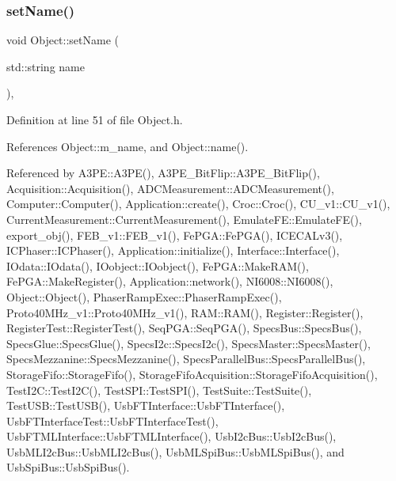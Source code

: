 \subsubsection{\texorpdfstring{set\+Name()}{setName()}}
{\footnotesize\ttfamily void Object\+::set\+Name (\begin{DoxyParamCaption}\item[{std\+::string}]{name }\end{DoxyParamCaption})\hspace{0.3cm}{\ttfamily [inline]}, {\ttfamily [inherited]}}



Definition at line 51 of file Object.\+h.



References Object\+::m\+\_\+name, and Object\+::name().



Referenced by A3\+P\+E\+::\+A3\+P\+E(), A3\+P\+E\+\_\+\+Bit\+Flip\+::\+A3\+P\+E\+\_\+\+Bit\+Flip(), Acquisition\+::\+Acquisition(), A\+D\+C\+Measurement\+::\+A\+D\+C\+Measurement(), Computer\+::\+Computer(), Application\+::create(), Croc\+::\+Croc(), C\+U\+\_\+v1\+::\+C\+U\+\_\+v1(), Current\+Measurement\+::\+Current\+Measurement(), Emulate\+F\+E\+::\+Emulate\+F\+E(), export\+\_\+obj(), F\+E\+B\+\_\+v1\+::\+F\+E\+B\+\_\+v1(), Fe\+P\+G\+A\+::\+Fe\+P\+G\+A(), I\+C\+E\+C\+A\+Lv3(), I\+C\+Phaser\+::\+I\+C\+Phaser(), Application\+::initialize(), Interface\+::\+Interface(), I\+Odata\+::\+I\+Odata(), I\+Oobject\+::\+I\+Oobject(), Fe\+P\+G\+A\+::\+Make\+R\+A\+M(), Fe\+P\+G\+A\+::\+Make\+Register(), Application\+::network(), N\+I6008\+::\+N\+I6008(), Object\+::\+Object(), Phaser\+Ramp\+Exec\+::\+Phaser\+Ramp\+Exec(), Proto40\+M\+Hz\+\_\+v1\+::\+Proto40\+M\+Hz\+\_\+v1(), R\+A\+M\+::\+R\+A\+M(), Register\+::\+Register(), Register\+Test\+::\+Register\+Test(), Seq\+P\+G\+A\+::\+Seq\+P\+G\+A(), Specs\+Bus\+::\+Specs\+Bus(), Specs\+Glue\+::\+Specs\+Glue(), Specs\+I2c\+::\+Specs\+I2c(), Specs\+Master\+::\+Specs\+Master(), Specs\+Mezzanine\+::\+Specs\+Mezzanine(), Specs\+Parallel\+Bus\+::\+Specs\+Parallel\+Bus(), Storage\+Fifo\+::\+Storage\+Fifo(), Storage\+Fifo\+Acquisition\+::\+Storage\+Fifo\+Acquisition(), Test\+I2\+C\+::\+Test\+I2\+C(), Test\+S\+P\+I\+::\+Test\+S\+P\+I(), Test\+Suite\+::\+Test\+Suite(), Test\+U\+S\+B\+::\+Test\+U\+S\+B(), Usb\+F\+T\+Interface\+::\+Usb\+F\+T\+Interface(), Usb\+F\+T\+Interface\+Test\+::\+Usb\+F\+T\+Interface\+Test(), Usb\+F\+T\+M\+L\+Interface\+::\+Usb\+F\+T\+M\+L\+Interface(), Usb\+I2c\+Bus\+::\+Usb\+I2c\+Bus(), Usb\+M\+L\+I2c\+Bus\+::\+Usb\+M\+L\+I2c\+Bus(), Usb\+M\+L\+Spi\+Bus\+::\+Usb\+M\+L\+Spi\+Bus(), and Usb\+Spi\+Bus\+::\+Usb\+Spi\+Bus().


